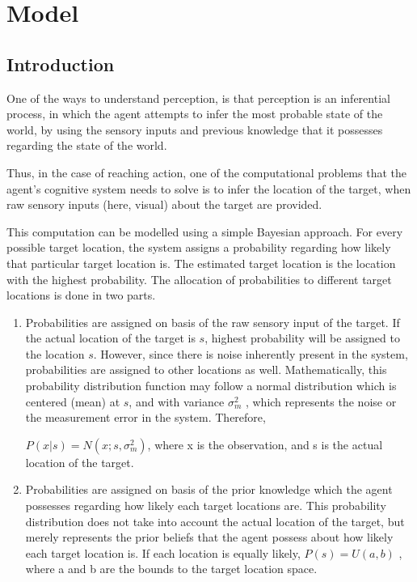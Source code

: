\chapter{Model}
\label{model}

\section{Introduction}
One of the ways to understand perception, is that perception is an inferential process, in which the agent attempts to infer the most probable state of the world, by using the sensory inputs and previous knowledge that it possesses regarding the state of the world. 

Thus, in the case of reaching action, one of the computational problems that the agent's cognitive system needs to solve is to infer the location of the target, when raw sensory inputs (here, visual) about the target are provided.  

This computation can be modelled using a simple Bayesian approach. For every possible target location, the system assigns a probability regarding how likely that particular target location is. The estimated target location is the location with the highest probability. 
The allocation of probabilities to different target locations is done in two parts.

\begin{enumerate}

\item Probabilities are assigned on basis of the raw sensory input of the target. If the actual location of the target is $s$, highest probability will be assigned to the location $s$. However, since there is noise inherently present in the system, probabilities are assigned to other locations as well. Mathematically, this probability distribution function may follow a normal distribution which is centered (mean) at $s$, and with variance $ \sigma_m^2$ , which represents the noise or the measurement error in the system. Therefore,

$ P(x|s) = N(x; s, \sigma_m^2) $, where x is the observation, and s is the actual location of the target. 

\item Probabilities are assigned on basis of the prior knowledge which the agent possesses regarding how likely each target locations are. This probability distribution does not take into account the actual location of the target, but merely represents the prior beliefs that the agent possess about how likely each target location is. If each location is equally likely, $ P(s) = U(a,b)$ , where a and b are the bounds to the target location space.

\end{enumerate}

